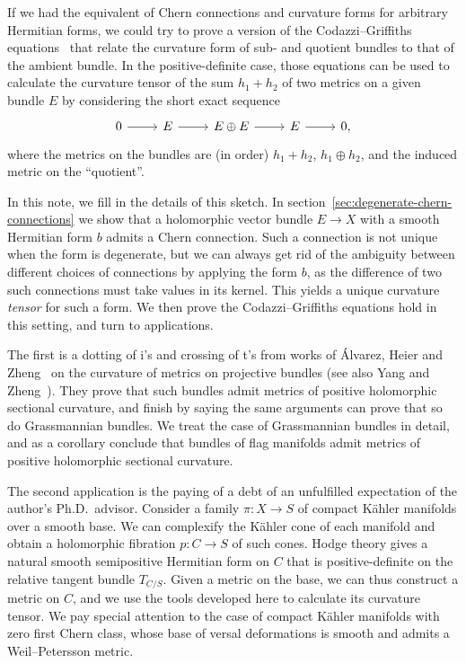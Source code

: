 \documentclass[10pt,a4paper]{amsart}
\theoremstyle{definition}
\begin{document}
If we had the equivalent of Chern connections and curvature forms for arbitrary Hermitian forms, we could try to prove a version of the Codazzi--Griffiths equations~\cite{griffiths1965hermitian} that relate the curvature form of sub- and quotient bundles to that of the ambient bundle. In the positive-definite case, those equations can be used to calculate the curvature tensor of the sum $h_1 + h_2$ of two metrics on a given bundle $E$ by considering the short exact sequence
\[
\begin{tikzcd}
0 \ar[r] & E \ar[r] & E\oplus E \ar[r] &  E \ar[r] & 0,
\end{tikzcd}
\]
where the metrics on the bundles are (in order) $h_1 + h_2$, $h_1 \oplus h_2$, and the induced metric on the ``quotient''.

In this note, we fill in the details of this sketch. In section~\ref{sec:degenerate-chern-connections} we show that a holomorphic vector bundle $E \to X$ with a smooth Hermitian form $b$ admits a Chern connection. Such a connection is not unique when the form is degenerate, but we can always get rid of the ambiguity between different choices of connections by applying the form $b$, as the difference of two such connections must take values in its kernel. This yields a unique curvature \emph{tensor} for such a form. We then prove the Codazzi--Griffiths equations hold in this setting, and turn to applications.

The first is a dotting of i's and crossing of t's from works of \'Alvarez, Heier and Zheng~\cite{alvarez2018projectivized,alvarez2016positive} on the curvature of metrics on projective bundles (see also Yang and Zheng~\cite{yang2019hirzebruch}). They prove that such bundles admit metrics of positive holomorphic sectional curvature, and finish by saying the same arguments can prove that so do Grassmannian bundles. We treat the case of Grassmannian bundles in detail, and as a corollary conclude that bundles of flag manifolds admit metrics of positive holomorphic sectional curvature.

The second application is the paying of a debt of an unfulfilled expectation of the author's Ph.D.~advisor. Consider a family $\pi : X \to S$ of compact K\"ahler manifolds over a smooth base. We can complexify the K\"ahler cone of each manifold and obtain a holomorphic fibration $p : C \to S$ of such cones. Hodge theory gives a natural smooth semipositive Hermitian form on $C$ that is positive-definite on the relative tangent bundle $T_{C/S}$. Given a metric on the base, we can thus construct a metric on $C$, and we use the tools developed here to calculate its curvature tensor. We pay special attention to the case of compact K\"ahler manifolds with zero first Chern class, whose base of versal deformations is smooth and admits a Weil--Petersson metric.
\end{document}

